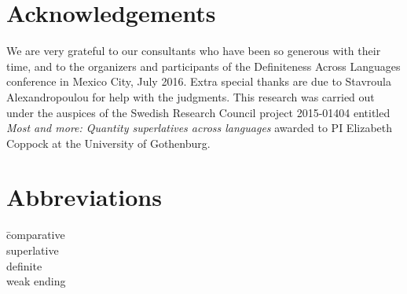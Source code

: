 \documentclass[output=paper
,modfonts
,nonflat]{langsci/langscibook}
\begin{document}
\section*{Acknowledgements}

We are very grateful to our consultants who have been so generous with their time, and to the organizers and participants of the Definiteness Across Languages conference in Mexico City, July 2016. Extra special thanks are due to Stavroula Alexandropoulou for help with the  judgments. This research was carried out under the auspices of the Swedish Research Council project 2015-01404 entitled \textit{Most and more: Quantity superlatives across languages} awarded to PI Elizabeth Coppock at the University of Gothenburg.

\section*{Abbreviations}
\begin{tabbing}
	\cmpr{}\hspace{1em} \= comparative\\ \kill
	\sprl{} \> superlative\\
	 \> definite\\
	\wk{} \> weak ending\\
\end{tabbing}

{\sloppy
\printbibliography[heading=subbibliography,notkeyword=this]
}
\end{document}
